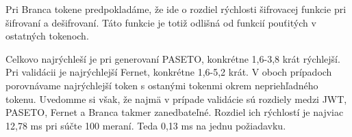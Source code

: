 Pri Branca tokene predpokladáme, že ide o rozdiel rýchlosti šifrovacej funkcie pri šifrovaní a dešifrovaní. Táto funkcie je totiž odlišná od funkcií pouťitých v ostatných tokenoch.

Celkovo najrýchleší je pri generovaní PASETO, konkrétne 1,6-3,8 krát rýchlejší. Pri validácii je najrýchlejší Fernet, konkrétne 1,6-5,2 krát. V oboch prípadoch porovnávame najrýchlejší token s ostanými tokenmi okrem nepriehľadného tokenu. Uvedomme si však, že najmä v prípade validácie sú rozdiely medzi JWT, PASETO, Fernet a Branca takmer zanedbateľné. Rozdiel ich rýchlostí je najviac 12,78 ms pri súčte 100 meraní. Teda 0,13 ms na jednu požiadavku.